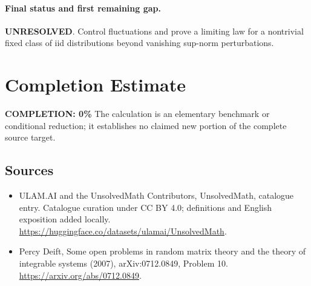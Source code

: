 \documentclass[11pt]{article}
\begin{document}
\paragraph{Final status and first remaining gap.}
\textbf{UNRESOLVED}. Control fluctuations and prove a limiting law for a nontrivial fixed class of iid distributions beyond vanishing sup-norm perturbations.

\section{Completion Estimate}
\noindent\textbf{COMPLETION: 0\%}
The calculation is an elementary benchmark or conditional reduction; it establishes no claimed new portion of the complete source target.

\subsection{Sources}
\begin{itemize}
\item[\hypertarget{source:statement:1}{S1}] ULAM.AI and the UnsolvedMath Contributors, UnsolvedMath, catalogue entry. Catalogue curation under CC BY 4.0; definitions and English exposition added locally.
\url{https://huggingface.co/datasets/ulamai/UnsolvedMath}.
\item[\hypertarget{source:statement:2}{S2}] Percy Deift, Some open problems in random matrix theory and the theory of integrable systems (2007), arXiv:0712.0849, Problem 10.
\url{https://arxiv.org/abs/0712.0849}.
\end{itemize}
\label{end:statement}
\end{document}
